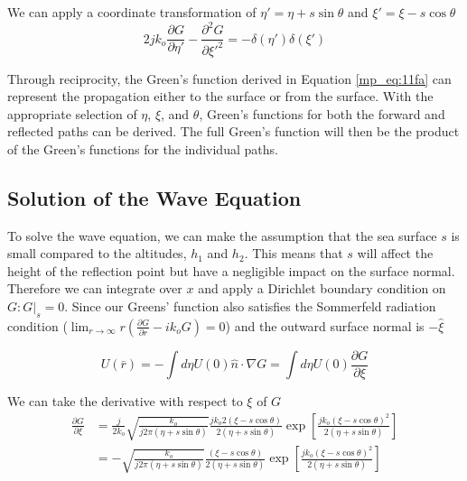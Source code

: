 We can apply a coordinate transformation of $\eta' = \eta + s\sin\theta$ and $\xi' = \xi - s\cos\theta$
\begin{equation}
2jk_o \frac{\partial G}{\partial \eta'} - \frac{\partial^2 G}{\partial \xi'^2} = -\delta(\eta')\delta(\xi')
\label{mp_eq:11aa}
\end{equation}

Through reciprocity, the Green's function derived in Equation \ref{mp_eq:11fa} can represent the propagation either to the surface or from the surface. With the appropriate selection of $\eta$, $\xi$, and $\theta$, Green's functions for both the forward and reflected paths can be derived. The full Green's function will then be the product of the Green's functions for the individual paths.

\subsection{Solution of the Wave Equation}
To solve the wave equation, we can make the assumption that the sea surface $s$ is small compared to the altitudes, $h_1$ and $h_2$. This means that $s$ will affect the height of the reflection point but have a negligible impact on the surface normal. Therefore we can integrate over $x$ and apply a Dirichlet boundary condition on $G: G|_s = 0$. Since our Greens' function also satisfies the Sommerfeld radiation condition ($\lim_{r\rightarrow\infty} r\left(\frac{\partial G}{\partial r} -ik_oG\right)= 0$) and the outward surface normal is $-\hat{\xi}$

\begin{equation}
U(\bar{r}) = -\int d\eta U(0) \hat{n} \cdot \nabla G = \int d\eta U(0) \frac{\partial G}{\partial \xi}
\label{mp_eq:12a}
\end{equation}

We can take the derivative with respect to $\xi$ of $G$
\begin{equation}
\begin{aligned}
\frac{\partial G}{\partial \xi} &= \frac{j}{2k_o}\sqrt{\frac{k_o}{j2\pi(\eta+s\sin\theta)}}\frac{jk_o2(\xi-s\cos\theta)}{2(\eta+s\sin\theta)}\exp\left[\frac{jk_o(\xi-s\cos\theta)^2}{2(\eta+s\sin\theta)}\right]\\
&= -\sqrt{\frac{k_o}{j2\pi(\eta+s\sin\theta)}}\frac{(\xi-s\cos\theta)}{2(\eta+s\sin\theta)}\exp\left[\frac{jk_o(\xi-s\cos\theta)^2}{2(\eta+s\sin\theta)}\right]\\
\end{aligned}
\label{mp_eq:12b}
\end{equation}


